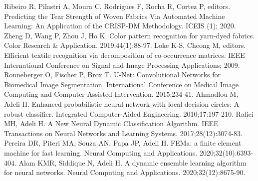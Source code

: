 \begin{thebibliography}{99}
Ribeiro R, Pilastri A, Moura C, Rodrigues F, Rocha R, Cortez P, editors. Predicting the Tear Strength of Woven Fabrics Via Automated Machine Learning: An Application of the CRISP-DM Methodology. ICEIS (1); 2020. 
Zheng D, Wang P, Zhou J, Ho K. Color pattern recognition for yarn-dyed fabrics. Color Research \& Application. 2019;44(1):88-97.
Loke K-S, Cheong M, editors. Efficient textile recognition via decomposition of co-occurrence matrices. IEEE International Conference on Signal and Image Processing Applications; 2009. 
Ronneberger O, Fischer P, Brox T. U-Net: Convolutional Networks for Biomedical Image Segmentation. International Conference on Medical Image Computing and Computer-Assisted Intervention. 2015;234-41.
Ahmadlou M, Adeli H. Enhanced probabilistic neural network with local decision circles: A robust classifier. Integrated Computer-Aided Engineering. 2010;17:197-210.
Rafiei MH, Adeli H. A New Neural Dynamic Classification Algorithm. IEEE Transactions on Neural Networks and Learning Systems. 2017;28(12):3074-83.
Pereira DR, Piteri MA, Souza AN, Papa JP, Adeli H. FEMa: a finite element machine for fast learning. Neural Computing and Applications. 2020;32(10):6393-404.
Alam KMR, Siddique N, Adeli H. A dynamic ensemble learning algorithm for neural networks. Neural Computing and Applications. 2020;32(12):8675-90.

\end{thebibliography}
